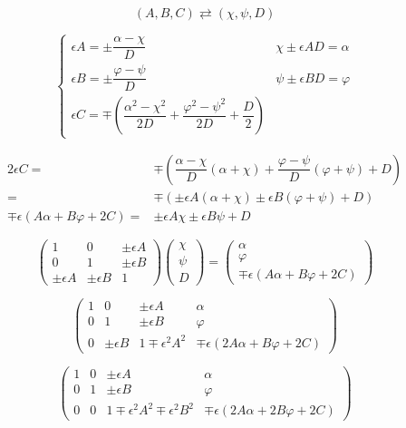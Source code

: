 \documentclass[
]{book}
\theoremstyle{definition}
\theoremstyle{definition}
\theoremstyle{definition}
\theoremstyle{definition}
\theoremstyle{remark}
\begin{document}
\[
\left(A,B,C\right)\rightleftarrows\left(\chi,\psi,D\right)
\]

\[
\begin{cases}
\epsilon A=\pm\dfrac{\alpha-\chi}{D} & \chi\pm\epsilon AD=\alpha\\
\epsilon B=\pm\dfrac{\varphi-\psi}{D} & \psi\pm\epsilon BD=\varphi\\
\epsilon C=\mp\left(\dfrac{\alpha^{2}-\chi^{2}}{2D}+\dfrac{\varphi^{2}-\psi^{2}}{2D}+\dfrac{D}{2}\right)
\end{cases}
\]

\[
\begin{aligned}
2\epsilon C= & \mp\left(\dfrac{\alpha-\chi}{D}\left(\alpha+\chi\right)+\dfrac{\varphi-\psi}{D}\left(\varphi+\psi\right)+D\right)\\
= & \mp\left(\pm\epsilon A\left(\alpha+\chi\right)\pm\epsilon B\left(\varphi+\psi\right)+D\right)\\
\mp\epsilon\left(A\alpha+B\varphi+2C\right)= & \pm\epsilon A\chi\pm\epsilon B\psi+D
\end{aligned}
\]

\[
\begin{pmatrix}1 & 0 & \pm\epsilon A\\
0 & 1 & \pm\epsilon B\\
\pm\epsilon A & \pm\epsilon B & 1
\end{pmatrix}\begin{pmatrix}\chi\\
\psi\\
D
\end{pmatrix}=\begin{pmatrix}\alpha\\
\varphi\\
\mp\epsilon\left(A\alpha+B\varphi+2C\right)
\end{pmatrix}
\]

\[
\begin{pmatrix}1 & 0 & \pm\epsilon A & \alpha\\
0 & 1 & \pm\epsilon B & \varphi\\
0 & \pm\epsilon B & 1\mp\epsilon^{2}A^{2} & \mp\epsilon\left(2A\alpha+B\varphi+2C\right)
\end{pmatrix}
\]

\[
\begin{pmatrix}1 & 0 & \pm\epsilon A & \alpha\\
0 & 1 & \pm\epsilon B & \varphi\\
0 & 0 & 1\mp\epsilon^{2}A^{2}\mp\epsilon^{2}B^{2} & \mp\epsilon\left(2A\alpha+2B\varphi+2C\right)
\end{pmatrix}
\]
\end{document}

